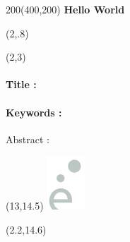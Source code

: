 
  \begin{textblock}{200}(400,200)
    \centering
    \vspace{20mm}
      { \bfseries \Large Hello World }
    \vspace{20mm}
  \end{textblock}



\begin{textblock}{10}(2,.8)
\logoED
\end{textblock}


\begin{textblock}{13}(2,3)
\paragraph{Title : \PhDTitleEN} 
\paragraph{Keywords : }\PhDkeywordsEN  \bigskip

Abstract : \PhDsumEN
\end{textblock}


\begin{textblock}{13}(13,14.5)
\includegraphics[height=2cm]{logo/logoEgrey.png}
\end{textblock}
\parindent=0pt 

\begin{textblock}{10}(2.2,14.6)

\end{textblock}



